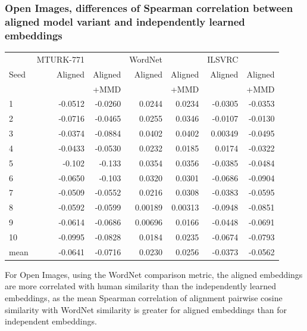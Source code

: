 \subsubsection{Open Images, differences of Spearman correlation between aligned model variant and independently learned embeddings}


\begin{table}[H]
\centering
\begin{tabular}{lrrrrrr}
  \toprule
       &   MTURK-771 &           &  WordNet  &           &  ILSVRC  &            \\
{Seed} &   Aligned   &  Aligned  &   Aligned &  Aligned  &  Aligned &  Aligned   \\
{}     &             & +MMD      &            & +MMD     &          &   +MMD     \\
\midrule
1    &     -0.0512 &    -0.0260  &   0.0244 &     0.0234 &    -0.0305 &    -0.0353   \\
2    &     -0.0716 &    -0.0465  &   0.0255 &     0.0346 &    -0.0107 &    -0.0130   \\
3    &     -0.0374 &    -0.0884  &   0.0402 &     0.0402 &     0.00349 &    -0.0495   \\
4    &     -0.0433 &    -0.0530  &   0.0232 &     0.0185 &     0.0174 &    -0.0322   \\
5    &     -0.102  &    -0.133   &   0.0354 &     0.0356 &    -0.0385 &    -0.0484   \\
6    &     -0.0650 &    -0.103   &   0.0320 &     0.0301 &    -0.0686 &    -0.0904   \\
7    &     -0.0509 &    -0.0552  &   0.0216 &     0.0308 &    -0.0383 &    -0.0595   \\
8    &     -0.0592 &    -0.0599  &   0.00189 &    0.00313 &   -0.0948 &    -0.0851   \\
9    &     -0.0614 &    -0.0686  &   0.00696 &    0.0166 &    -0.0448 &    -0.0691   \\
10   &     -0.0995 &    -0.0828  &   0.0184 &     0.0235 &    -0.0674 &    -0.0793   \\
\midrule                                                                                          
mean &     -0.0641 &    -0.0716  &   0.0230 &     0.0256 &    -0.0373 &    -0.0562   \\
\bottomrule
\end{tabular}
\end{table}


For Open Images, using the WordNet comparison metric, the aligned embeddings are more correlated with human similarity than the independently learned embeddings, as the mean Spearman correlation of alignment pairwise cosine similarity with WordNet similarity is greater for aligned embeddings than for independent embeddings. 

